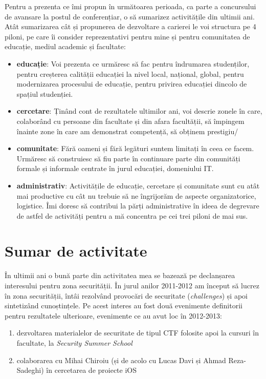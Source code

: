 \documentclass[11pt,a4paper]{article}
\begin{document}
Pentru a prezenta ce îmi propun în următoarea perioada, ca parte a concursului de avansare la postul de conferențiar, o să sumarizez activitățile din ultimii ani. Atât sumarizarea cât și propunerea de dezvoltare a carierei le voi structura pe 4 piloni, pe care îi consider reprezentativi pentru mine și pentru comunitatea de educație, mediul academic și facultate:
\begin{itemize}
  \item \textbf{educație}: Voi prezenta ce urmăresc să fac pentru îndrumarea studenților, pentru creșterea calității educației la nivel local, național, global, pentru modernizarea procesului de educație, pentru privirea educației dincolo de spațiul studenției.
  \item \textbf{cercetare}: Ținând cont de rezultatele ultimilor ani, voi descrie zonele în care, colaborând cu persoane din facultate și din afara facultății, să împingem înainte zone în care am demonstrat competență, să obținem prestigiu/
  \item \textbf{comunitate}: Fără oameni și fără legături suntem limitați în ceea ce facem. Urmăresc să construiesc să fiu parte în continuare parte din comunități formale și informale centrate în jurul educației, domeniului IT.
  \item \textbf{administrativ}: Activitățile de educație, cercetare și comunitate sunt cu atât mai productive cu cât nu trebuie să ne îngrijorăm de aspecte organizatorice, logistice. Îmi doresc să contribui la părți administrative în ideea de degrevare de astfel de activități pentru a mă concentra pe cei trei piloni de mai sus.
\end{itemize}

\section*{Sumar de activitate}

În ultimii ani o bună parte din activitatea mea se bazează pe declanșarea interesului pentru zona securității. În jurul anilor 2011-2012 am început să lucrez în zona securității, întâi rezolvând provocări de securitate (\textit{challenges}) și apoi sintetizând cunoștințele. Pe acest interes au fost două evenimente definitorii pentru rezultatele ulterioare, evenimente ce au avut loc în 2012-2013:
\begin{enumerate}
  \item dezvoltarea materialelor de securitate de tipul CTF folosite apoi la cursuri în facultate, la \textit{Security Summer School}
  \item colaborarea cu Mihai Chiroiu (și de acolo cu Lucas Davi și Ahmad Reza-Sadeghi) în cercetarea de proiecte iOS
\end{enumerate}
\end{document}

